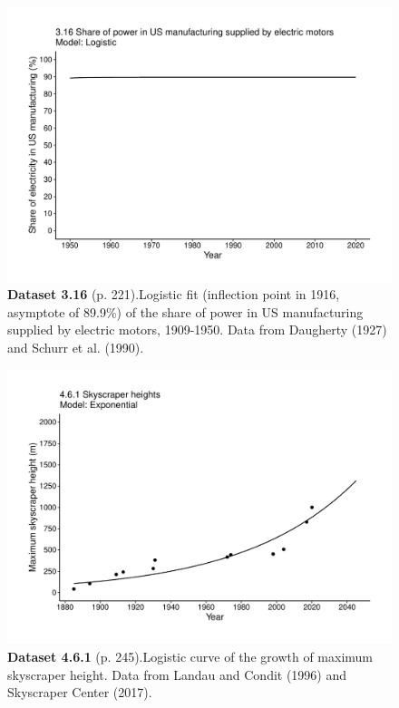 \documentclass[aps,rmp,preprint,superscriptaddress,10pt,onecolumn]{article}
\begin{document}
\clearpage
\begin{figure}[h]
\includegraphics[width=\textwidth]{output/figs-ggplot/3.16.pdf}
\caption*{\textbf{Dataset 3.16} (p. 221).Logistic fit (inflection point in 1916, asymptote of 89.9\%) of the share of power in US manufacturing supplied by electric motors, 1909-1950. Data from Daugherty (1927) and Schurr et al. (1990).}
\end{figure}
	
\clearpage
\begin{figure}[h]
\includegraphics[width=\textwidth]{output/figs-ggplot/4.6.1.pdf}
\caption*{\textbf{Dataset 4.6.1} (p. 245).Logistic curve of the growth of maximum skyscraper height. Data from Landau and Condit (1996) and Skyscraper Center (2017).}
\end{figure}
	
\end{document}
